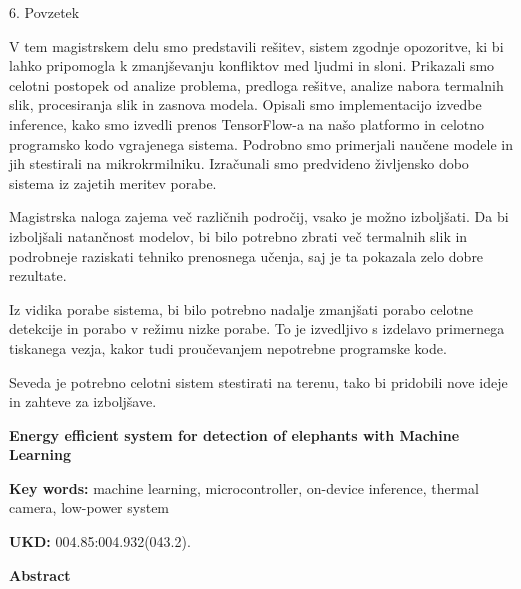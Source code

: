 {6. Povzetek

V tem magistrskem delu smo predstavili rešitev, sistem zgodnje opozoritve, ki bi lahko pripomogla k zmanjševanju konfliktov med ljudmi in sloni.
Prikazali smo celotni postopek od analize problema, predloga rešitve, analize nabora termalnih slik, procesiranja slik in zasnova modela.
Opisali smo implementacijo izvedbe inference, kako smo izvedli prenos TensorFlow-a na našo platformo in celotno programsko kodo vgrajenega sistema.
Podrobno smo primerjali naučene modele in jih stestirali na mikrokrmilniku.
Izračunali smo predvideno življensko dobo sistema iz zajetih meritev porabe.

Magistrska naloga zajema več različnih področij, vsako je možno izboljšati.
Da bi izboljšali natančnost modelov, bi bilo potrebno zbrati več termalnih slik in podrobneje raziskati tehniko prenosnega učenja, saj je ta pokazala zelo dobre rezultate.

Iz vidika porabe sistema, bi bilo potrebno nadalje zmanjšati porabo celotne detekcije in porabo v režimu nizke porabe.
To je izvedljivo s izdelavo primernega tiskanega vezja, kakor tudi proučevanjem nepotrebne programske kode.

Seveda je potrebno celotni sistem stestirati na terenu, tako bi pridobili nove ideje in zahteve za izboljšave.
}
\newpage

\begin{poglavje}
\noindent\bfseries Energy efficient system for detection of elephants with Machine Learning
\end{poglavje}

\bigskip
\bigskip
\bigskip
\bigskip
\bigskip
\textbf{Key words:} machine learning, microcontroller, on-device inference, thermal camera, low-power system

\bigskip
\textbf{UKD:} 004.85:004.932(043.2).

\bigskip
\textbf{Abstract}

